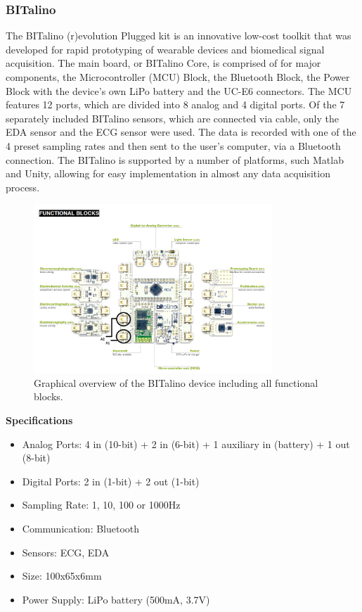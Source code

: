 \subsubsection{BITalino}
The BITalino (r)evolution Plugged kit is an innovative low-cost toolkit that was developed for rapid prototyping of wearable devices and biomedical signal acquisition. The main board, or BITalino Core, is comprised of for major components, the Microcontroller (MCU) Block, the Bluetooth Block, the Power Block with the device's own LiPo battery and the UC-E6 connectors. The MCU features 12 ports, which are divided into 8 analog and 4 digital ports. Of the 7 separately included BITalino sensors, which are connected via cable, only the EDA sensor and the ECG sensor were used. The data is recorded with one of the 4 preset sampling rates and then sent to the user's computer, via a Bluetooth connection. The BITalino is supported by a number of platforms, such Matlab and Unity, allowing for easy implementation in almost any data acquisition process.\\

\begin{figure}[h]
\centering
\includegraphics[width=0.8\textwidth]{images/BitOverview.png}
\caption{Graphical overview of the BITalino device including all functional blocks.}
\label{bitImg}
\end{figure}

\newpage
 
\textbf{Specifications}
\begin{itemize}
\item Analog Ports: 4 in (10-bit) + 2 in (6-bit) + 1 auxiliary in (battery) + 1 out (8-bit)
\item Digital Ports: 2 in (1-bit) + 2 out (1-bit)
\item Sampling Rate: 1, 10, 100 or 1000Hz
\item Communication: Bluetooth
\item Sensors: ECG, EDA
\item Size: 100x65x6mm
\item Power Supply: LiPo battery (500mA, 3.7V)
\end{itemize}

